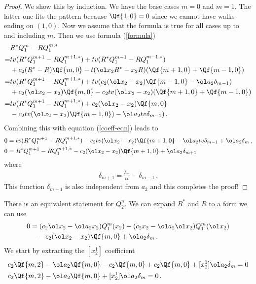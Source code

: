 \begin{proof}We show this by induction. We have the base cases $m = 0$ and $m=1$. The latter one fits the pattern because $\Qf{1,0} = 0$ since we cannot have walks ending on $(1,0)$. Now we assume that the formula is true for all cases up to and including $m$. Then we use formula (\ref{formula})
\begin{align}
\begin{split}
	& R^\ast Q_1^m -R Q_1^{m,\ast}\\
	=&tv(R^\ast Q_1^{m+1}-R Q_1^{m+1,\ast}) + tv(R^\ast Q_1^{m-1}-R Q_1^{m-1,\ast})\\
	   & + c_2(R^\ast-R)\Qf{m,0}-t(\ol x_2R^\ast-x_2 R)(\Qf{m+1,0}+\Qf{m-1,0})\\
	=& tv(R^\ast Q_1^{m+1}-R Q_1^{m+1,\ast}) + tv(c_2(\ol x_2-x_2)\Qf{m-1,0}- \ol a_2\delta_{m-1})\\
	   & + c_2(\ol x_2-x_2)\Qf{m,0}-c_2tv(\ol x_2-x_2)(\Qf{m+1,0}+\Qf{m-1,0})\\
	=& tv(R^\ast Q_1^{m+1}-R Q_1^{m+1,\ast})+ c_2(\ol x_2-x_2)\Qf{m,0}\\
	   &-c_2tv(\ol x_2-x_2)\Qf{m+1,0}) -  \ol a_2tv\delta_{m-1})\,.
\end{split}
\end{align}
Combining this with equation (\ref{coeff-eqn}) leads to
\begin{align}
	0 &= tv(R^\ast Q_1^{m+1}-R Q_1^{m+1,\ast})-c_2tv(\ol x_2-x_2)\Qf{m+1,0} -  \ol a_2tv\delta_{m-1} + \ol a_2\delta_m\,, \\
	0 & = R^\ast Q_1^{m+1}-R Q_1^{m+1,\ast}-c_2(\ol x_2-x_2)\Qf{m+1,0}+  \ol a_2\delta_{m+1}
\end{align}
where
\begin{align}
  \delta_{m+1} =\frac{\delta_m}{tv}-\delta_{m-1}\,.
\end{align}
This function $\delta_{m+1}$ is also independent from $a_2$ and this completes the proof!
\end{proof}
There is an equivalent statement for $Q_2^n$. We can expand $R^\ast$ and $R$ to a form we can use
\begin{align}\begin{split}
	0 &=(c_2\ol x_2- \ol a_2x_2)Q_1^m(x_2) -( c_2x_2- \ol a_2\ol x_2)Q_1^m(\ol x_2) \\
	&\quad- c_2(\ol x_2-x_2)\Qf{m,0} + \ol a_2\delta_m \,.
\end{split}\end{align}
We start by extracting the $[x_2^1]$ coefficient
\begin{align}\begin{split}
	& c_2\Qf{m,2}- \ol a_2\Qf{m,0}-c_2\Qf{m,0} +c_2\Qf{m,0}+ [x_2^1] \ol a_2\delta_m = 0\\
	& c_2\Qf{m,2}- \ol a_2\Qf{m,0}+ [x_2^1] \ol a_2\delta_m = 0\,.
\end{split}\end{align}
